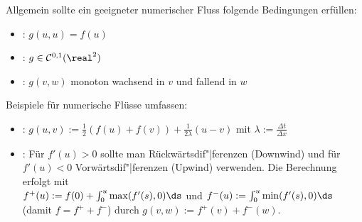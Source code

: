 \linie

\begin{Bem}
    Allgemein sollte ein geeigneter numerischer Fluss folgende Bedingungen erfüllen:
    \begin{itemize}
        \item
        :
        $g(u, u) = f(u)$
        
        \item
        :
        $g \in \C^{0,1}(\real^2)$
        
        \item
        :
        $g(v, w)$ monoton wachsend in $v$ und fallend in $w$
    \end{itemize}
\end{Bem}

\begin{Bsp}
    Beispiele für numerische Flüsse umfassen:
    \begin{itemize}
        \item
        :
        $g(u, v) := \frac{1}{2} (f(u) + f(v)) + \frac{1}{2\lambda} (u - v)$
        mit $\lambda := \frac{\Delta t}{\Delta x}$
        
        \item
        :
        Für $f'(u) > 0$ sollte man Rückwärtsdif"|ferenzen (Downwind)
        und für $f'(u) < 0$ Vorwärtsdif"|ferenzen (Upwind) verwenden.
        Die Berechnung erfolgt mit\\
        $f^+(u) := f(0) + \int_0^u \max(f'(s), 0) \ds$ und
        $f^-(u) := \int_0^u \min(f'(s), 0) \ds$ (damit $f = f^+ + f^-$)
        durch $g(v, w) := f^+(v) + f^-(w)$.
    \end{itemize}
\end{Bsp}

\pagebreak
